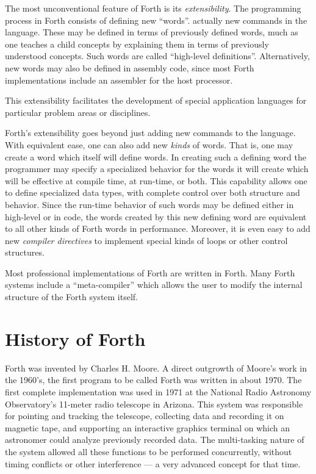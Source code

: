 The most unconventional feature of Forth is its \emph{extensibility}.
The programming process in Forth consists of defining new ``words''.
actually new commands in the language. These may be defined in terms
of previously defined words, much as one teaches a child concepts by
explaining them in terms of previously understood concepts. Such
words are called ``high-level definitions''. Alternatively, new
words may also be defined in assembly code, since most Forth
implementations include an assembler for the host processor.

This extensibility facilitates the development of special application
languages for particular problem areas or disciplines.

Forth's extensibility goes beyond just adding new commands to the
language. With equivalent ease, one can also add new \emph{kinds} of
words. That is, one may create a word which itself will define
words. In creating such a defining word the programmer may specify
a specialized behavior for the words it will create which will be
effective at compile time, at run-time, or both. This capability
allows one to define specialized data types, with complete control
over both structure and behavior. Since the run-time behavior of
such words may be defined either in high-level or in code, the words
created by this new defining word are equivalent to all other kinds
of Forth words in performance. Moreover, it is even easy to add new
\emph{compiler directives} to implement special kinds of loops or
other control structures.

Most professional implementations of Forth are written in Forth.
Many Forth systems include a ``meta-compiler'' which allows the user
to modify the internal structure of the Forth system itself.


\section{History of Forth} %

Forth was invented by Charles H. Moore. A direct outgrowth of Moore's
work in the 1960's, the first program to be called Forth was written
in about 1970. The first complete implementation was used in 1971 at
the National Radio Astronomy Observatory's 11-meter radio telescope
in Arizona. This system was responsible for pointing and tracking the
telescope, collecting data and recording it on magnetic tape, and
supporting an interactive graphics terminal on which an astronomer
could analyze previously recorded data. The multi-tasking nature of
the system allowed all these functions to be performed concurrently,
without timing conflicts or other interference --- a very advanced
concept for that time.

